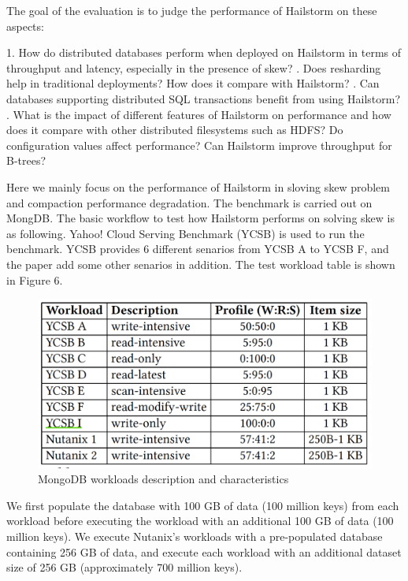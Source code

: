 \documentclass[a4paper,10pt,twoside]{article}
\begin{document}
The goal of the evaluation is to judge the performance of Hailstorm on these aspects:
\begin{displayquote}
1. How do distributed databases perform when deployed
on Hailstorm in terms of throughput and latency, especially
in the presence of skew? 
. Does resharding help in traditional deployments? How
does it compare with Hailstorm?
. Can databases supporting distributed SQL transactions
benefit from using Hailstorm? 
. What is the impact of different features of Hailstorm
on performance and how does it compare with other
distributed filesystems such as HDFS? Do configuration
values affect performance? Can Hailstorm
improve throughput for B-trees?
\end{displayquote}
Here we mainly focus on the performance of Hailstorm in sloving skew problem and compaction performance degradation.
The benchmark is carried out on MongDB.
The basic workflow to test how Hailstorm performs on solving skew is as following.
Yahoo! Cloud Serving Benchmark (YCSB) is used to run the benchmark.
YCSB provides 6 different senarios from YCSB A to YCSB F, and the paper add some other senarios in addition.
The test workload table is shown in Figure 6.
\begin{figure}[h]
    \centering
	\includegraphics[scale=0.3]{YCSB_workload.png}
    \caption{MongoDB workloads description and characteristics}
    \label{fig:mesh1}
\end{figure}
\begin{displayquote}
	We first populate the database with 100 GB of data (100
	million keys) from each workload before executing the workload
	with an additional 100 GB of data (100 million keys).
	We execute Nutanix’s workloads with a pre-populated database
	containing 256 GB of data, and execute each workload
	with an additional dataset size of 256 GB (approximately 700
	million keys).
\end{displayquote}
\end{document}
